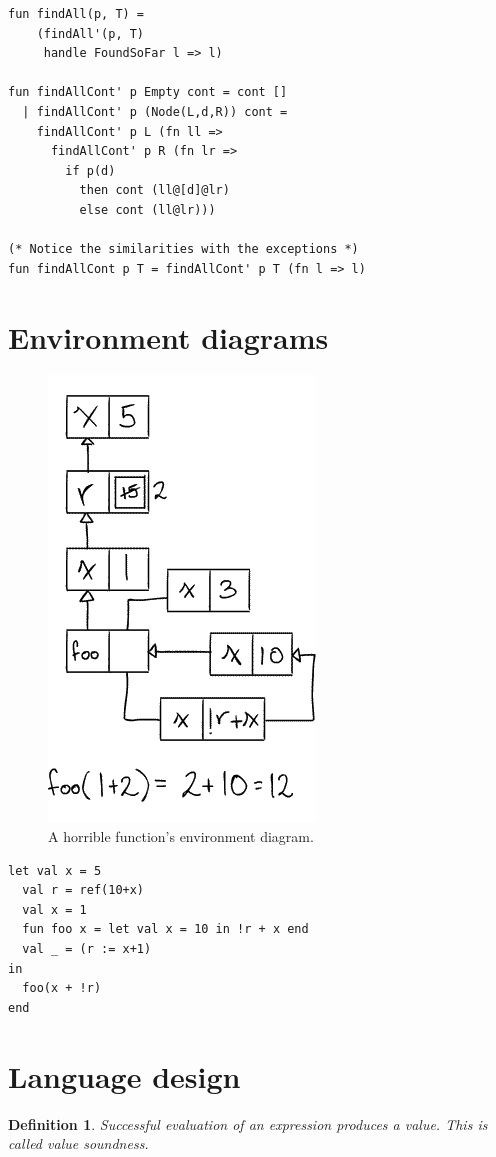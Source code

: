 \documentclass[10pt]{article}
\newtheorem{definition}{Definition}
\begin{document}
\begin{multicols}{2}
\begin{verbatim}
fun findAll(p, T) =
    (findAll'(p, T)
     handle FoundSoFar l => l)

fun findAllCont' p Empty cont = cont []
  | findAllCont' p (Node(L,d,R)) cont =
    findAllCont' p L (fn ll =>
      findAllCont' p R (fn lr =>
        if p(d)
          then cont (ll@[d]@lr)
          else cont (ll@lr)))

(* Notice the similarities with the exceptions *)
fun findAllCont p T = findAllCont' p T (fn l => l)
\end{verbatim}

\section{Environment diagrams}
\begin{figure}
\includegraphics[width=0.5\linewidth]{environment-diagram.png}
\caption{A horrible function's environment diagram.}
\end{figure}
\begin{verbatim}
let val x = 5
  val r = ref(10+x)
  val x = 1
  fun foo x = let val x = 10 in !r + x end
  val _ = (r := x+1)
in
  foo(x + !r)
end
\end{verbatim}

\section{Language design}

\begin{definition}
    Successful evaluation of an expression produces a value. This is called
    \emph{value soundness}.
\end{definition}


\end{multicols}
\end{document}
